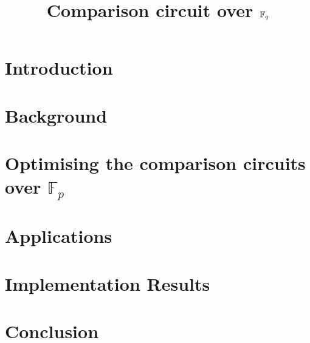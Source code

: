 \documentclass{llncs}
\title{Comparison circuit over $\mathbb{F}_q$}
\date{}
\author{}
\begin{document}
\maketitle

\section{Introduction}
\label{sec:introduction}


\section{Background}
\label{sec:background}


% 

\section{Optimising the comparison circuits over $\mathbb{F}_p$}
\label{sec:comparison-circuit}



\section{Applications}
\label{sec:applications}


\section{Implementation Results}
\label{sec:impl-results}


% 

\section*{Conclusion}




\end{document}
